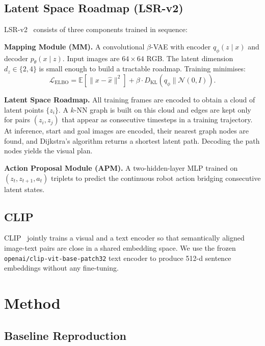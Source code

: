 \documentclass[10pt,twocolumn]{IEEEtran}
\begin{document}
\subsection{Latent Space Roadmap (LSR-v2)}

LSR-v2~\cite{lippi2023lsr} consists of three components trained in
sequence:

\textbf{Mapping Module (MM).}  A convolutional $\beta$-VAE with encoder
$q_\phi(z \mid x)$ and decoder $p_\theta(x \mid z)$.  Input images are
$64 \times 64$ RGB.  The latent dimension $d_z \in \{2, 4\}$ is small
enough to build a tractable roadmap.  Training minimises:
\begin{equation}
  \mathcal{L}_{\text{ELBO}} =
    \mathbb{E}[\|x - \hat{x}\|^2] +
    \beta \cdot D_{\mathrm{KL}}(q_\phi \| \mathcal{N}(0,I)).
\end{equation}

\textbf{Latent Space Roadmap.}  All training frames are encoded to obtain
a cloud of latent points $\{z_i\}$.  A $k$-NN graph is built on this cloud
and edges are kept only for pairs $(z_i, z_j)$ that appear as consecutive
timesteps in a training trajectory.  At inference, start and goal images
are encoded, their nearest graph nodes are found, and Dijkstra's algorithm
returns a shortest latent path.  Decoding the path nodes yields the visual
plan.

\textbf{Action Proposal Module (APM).}  A two-hidden-layer MLP trained
on $(z_t, z_{t+1}, a_t)$ triplets to predict the continuous robot action
bridging consecutive latent states.

\subsection{CLIP}

CLIP~\cite{radford2021clip} jointly trains a visual and a text encoder so
that semantically aligned image-text pairs are close in a shared embedding
space.  We use the frozen \texttt{openai/clip-vit-base-patch32} text
encoder to produce 512-d sentence embeddings without any fine-tuning.

\section{Method}

\subsection{Baseline Reproduction}
\end{document}
